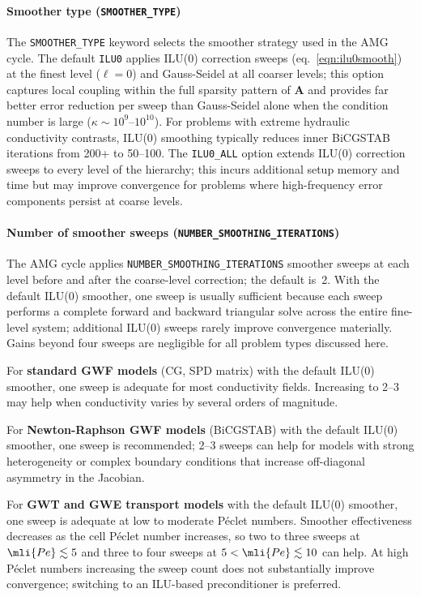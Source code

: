 \paragraph{Smoother type (\texttt{SMOOTHER\_TYPE})}
The \texttt{SMOOTHER\_TYPE} keyword selects the smoother strategy used in the AMG cycle. The default \texttt{ILU0} applies ILU(0) correction sweeps (eq.~\ref{eqn:ilu0smooth}) at the finest level ($\ell = 0$) and Gauss-Seidel at all coarser levels; this option captures local coupling within the full sparsity pattern of $\mathbf{A}$ and provides far better error reduction per sweep than Gauss-Seidel alone when the condition number is large ($\kappa \sim 10^9$--$10^{10}$). For problems with extreme hydraulic conductivity contrasts, ILU(0) smoothing typically reduces inner BiCGSTAB iterations from 200{+} to 50--100. The \texttt{ILU0\_ALL} option extends ILU(0) correction sweeps to every level of the hierarchy; this incurs additional setup memory and time but may improve convergence for problems where high-frequency error components persist at coarse levels.

\paragraph{Number of smoother sweeps (\texttt{NUMBER\_SMOOTHING\_ITERATIONS})}
The AMG cycle applies \texttt{NUMBER\_SMOOTHING\_ITERATIONS} smoother sweeps at each level before and after the coarse-level correction; the default is~2. With the default ILU(0) smoother, one sweep is usually sufficient because each sweep performs a complete forward and backward triangular solve across the entire fine-level system; additional ILU(0) sweeps rarely improve convergence materially. Gains beyond four sweeps are negligible for all problem types discussed here.

For \textbf{standard GWF models} (CG, SPD matrix) with the default ILU(0) smoother, one sweep is adequate for most conductivity fields. Increasing to 2--3 may help when conductivity varies by several orders of magnitude.

For \textbf{Newton-Raphson GWF models} (BiCGSTAB) with the default ILU(0) smoother, one sweep is recommended; 2--3 sweeps can help for models with strong heterogeneity or complex boundary conditions that increase off-diagonal asymmetry in the Jacobian.

For \textbf{GWT and GWE transport models} with the default ILU(0) smoother, one sweep is adequate at low to moderate Péclet numbers. Smoother effectiveness decreases as the cell Péclet number increases, so two to three sweeps at $\mli{Pe} \lesssim 5$ and three to four sweeps at $5 < \mli{Pe} \lesssim 10$ can help. At high Péclet numbers increasing the sweep count does not substantially improve convergence; switching to an ILU-based preconditioner is preferred.

